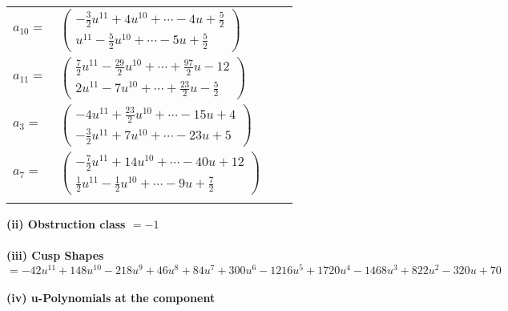 \documentclass[1p]{elsarticle_modified}
\theoremstyle{definition}
\begin{document}
\begin{tabular}{m{7pt} m{180pt} m{7pt} m{180pt} }
\flushright $a_{10}=$&$\begin{pmatrix}-\frac{3}{2} u^{11}+4 u^{10}+\cdots-4 u+\frac{5}{2}\\u^{11}-\frac{5}{2} u^{10}+\cdots-5 u+\frac{5}{2}\end{pmatrix}$ \\
\flushright $a_{11}=$&$\begin{pmatrix}\frac{7}{2} u^{11}-\frac{29}{2} u^{10}+\cdots+\frac{97}{2} u-12\\2 u^{11}-7 u^{10}+\cdots+\frac{23}{2} u-\frac{5}{2}\end{pmatrix}$ \\
\flushright $a_{3}=$&$\begin{pmatrix}-4 u^{11}+\frac{23}{2} u^{10}+\cdots-15 u+4\\-\frac{3}{2} u^{11}+7 u^{10}+\cdots-23 u+5\end{pmatrix}$ \\
\flushright $a_{7}=$&$\begin{pmatrix}-\frac{7}{2} u^{11}+14 u^{10}+\cdots-40 u+12\\\frac{1}{2} u^{11}-\frac{1}{2} u^{10}+\cdots-9 u+\frac{7}{2}\end{pmatrix}$\\&\end{tabular}
\flushleft \textbf{(ii) Obstruction class $= -1$}\\~\\
\flushleft \textbf{(iii) Cusp Shapes $= -42 u^{11}+148 u^{10}-218 u^9+46 u^8+84 u^7+300 u^6-1216 u^5+1720 u^4-1468 u^3+822 u^2-320 u+70$}\\~\\
\newpage\renewcommand{\arraystretch}{1}
\flushleft \textbf{(iv) u-Polynomials at the component}\newline \\
\end{document}
